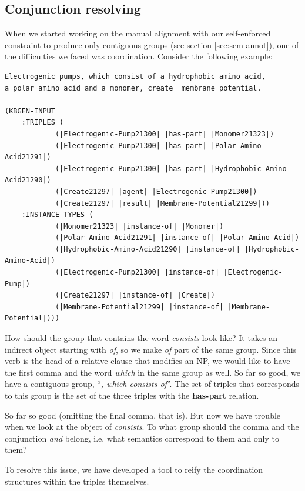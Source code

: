 \documentclass[a4paper]{article}
\begin{document}
\subsection{Conjunction resolving}

When we started working on the manual alignment with our self-enforced
constraint to produce only contiguous groups (see section
\ref{sec:sem-annot}), one of the difficulties we faced was
coordination. Consider the following example:

\begin{verbatim}
Electrogenic pumps, which consist of a hydrophobic amino acid,
a polar amino acid and a monomer, create  membrane potential.

(KBGEN-INPUT 
    :TRIPLES (
            (|Electrogenic-Pump21300| |has-part| |Monomer21323|)
            (|Electrogenic-Pump21300| |has-part| |Polar-Amino-Acid21291|)
            (|Electrogenic-Pump21300| |has-part| |Hydrophobic-Amino-Acid21290|)
            (|Create21297| |agent| |Electrogenic-Pump21300|)
            (|Create21297| |result| |Membrane-Potential21299|))
    :INSTANCE-TYPES (
            (|Monomer21323| |instance-of| |Monomer|)
            (|Polar-Amino-Acid21291| |instance-of| |Polar-Amino-Acid|)
            (|Hydrophobic-Amino-Acid21290| |instance-of| |Hydrophobic-Amino-Acid|)
            (|Electrogenic-Pump21300| |instance-of| |Electrogenic-Pump|)
            (|Create21297| |instance-of| |Create|)
            (|Membrane-Potential21299| |instance-of| |Membrane-Potential|)))
\end{verbatim}

How should the group that contains the word \emph{consists} look like?
It takes an indirect object starting with \emph{of}, so we make
\emph{of} part of the same group. Since this verb is the head of a
relative clause that modifies an NP, we would like to have the first
comma and the word \emph{which} in the same group as well. So far so
good, we have a contiguous group, ``\emph{, which consists of}''. The
set of triples that corresponds to this group is the set of the three
triples with the \textbf{has-part} relation.

So far so good (omitting the final comma, that is). But now we have
trouble when we look at the object of \emph{consists}. To what group
should the comma and the conjunction \emph{and} belong, i.e. what
semantics correspond to them and only to them?

To resolve this issue, we have developed a tool to reify the
coordination structures within the triples themselves.
\end{document}
